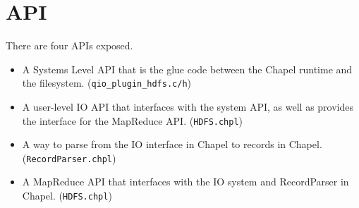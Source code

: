 
\section{API}\label{s:API}

There are four APIs exposed. 
\begin{itemize}
\item A Systems Level API that is the glue code between the Chapel runtime
and the filesystem. ({\tt qio\_plugin\_hdfs.c/h})
\item A user-level IO API that interfaces with the system API, as well as
provides the interface for the MapReduce API.
({\tt HDFS.chpl})
\item A way to parse from the IO interface in Chapel to records in Chapel.
({\tt RecordParser.chpl})
\item A MapReduce API that interfaces with the IO system and
RecordParser in Chapel. ({\tt HDFS.chpl})
\end{itemize}
%
